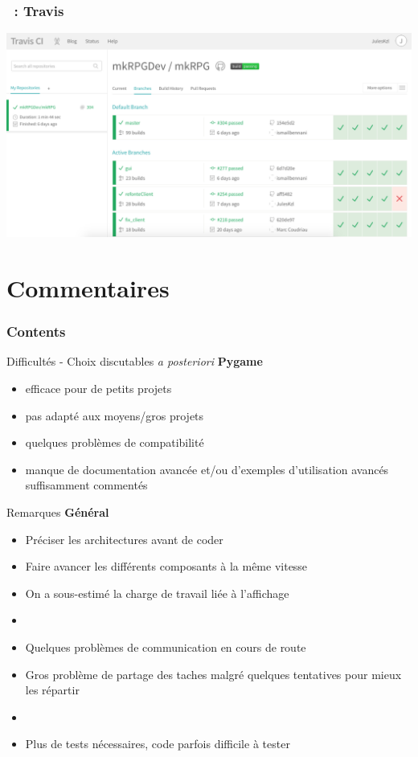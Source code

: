 \documentclass[11pt]{beamer}
\begin{document}
\begin{frame}
    \frametitle{\secname~: Travis}
\includegraphics[scale=0.3]{travis}
\end{frame}


\section{Commentaires}

    \begin{frame}
        \frametitle{Contents}
        \tableofcontents[currentsection]
    \end{frame}
    
\begin{frame}{Difficultés - Choix discutables \textit{a posteriori}}
	\textbf{Pygame}
	\begin{itemize}
		\item efficace pour de petits projets
		\item pas adapté aux moyens/gros projets
		\item quelques problèmes de compatibilité
		\item manque de documentation avancée et/ou d'exemples d'utilisation avancés suffisamment commentés
	\end{itemize}
\end{frame}


\begin{frame}{Remarques}
	\textbf{Général}
	\begin{itemize}
		\item Préciser les architectures avant de coder
		\item Faire avancer les différents composants à la même vitesse
		\item On a sous-estimé la charge de travail liée à l'affichage
		\item[]
		\item Quelques problèmes de communication en cours de route
		\item Gros problème de partage des taches malgré quelques tentatives pour mieux les répartir
		\item[]
		\item Plus de tests nécessaires, code parfois difficile à tester
	\end{itemize}
\end{frame}
\end{document}
